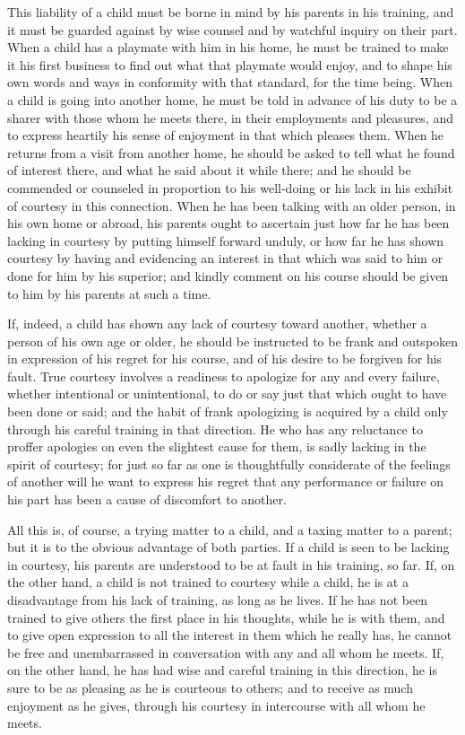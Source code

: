 \documentclass[
]{book}
\begin{document}
This liability of a child must be borne in mind by his parents in his training, and it must be guarded against by wise counsel and by watchful inquiry on their part. When a child has a playmate with him in his home, he must be trained to make it his first business to find out what that playmate would enjoy, and to shape his own words and ways in conformity with that standard, for the time being. When a child is going into another home, he must be told in advance of his duty to be a sharer with those whom he meets there, in their employments and pleasures, and to express heartily his sense of enjoyment in that which pleases them. When he returns from a visit from another home, he should be asked to tell what he found of interest there, and what he said about it while there; and he should be commended or counseled in proportion to his well-doing or his lack in his exhibit of courtesy in this connection. When he has been talking with an older person, in his own home or abroad, his parents ought to ascertain just how far he has been lacking in courtesy by putting himself forward unduly, or how far he has shown courtesy by having and evidencing an interest in that which was said to him or done for him by his superior; and kindly comment on his course should be given to him by his parents at such a time.

If, indeed, a child has shown any lack of courtesy toward another, whether a person of his own age or older, he should be instructed to be frank and outspoken in expression of his regret for his course, and of his desire to be forgiven for his fault. True courtesy involves a readiness to apologize for any and every failure, whether intentional or unintentional, to do or say just that which ought to have been done or said; and the habit of frank apologizing is acquired by a child only through his careful training in that direction. He who has any reluctance to proffer apologies on even the slightest cause for them, is sadly lacking in the spirit of courtesy; for just so far as one is thoughtfully considerate of the feelings of another will he want to express his regret that any performance or failure on his part has been a cause of discomfort to another.

All this is, of course, a trying matter to a child, and a taxing matter to a parent; but it is to the obvious advantage of both parties. If a child is seen to be lacking in courtesy, his parents are understood to be at fault in his training, so far. If, on the other hand, a child is not trained to courtesy while a child, he is at a disadvantage from his lack of training, as long as he lives. If he has not been trained to give others the first place in his thoughts, while he is with them, and to give open expression to all the interest in them which he really has, he cannot be free and unembarrassed in conversation with any and all whom he meets. If, on the other hand, he has had wise and careful training in this direction, he is sure to be as pleasing as he is courteous to others; and to receive as much enjoyment as he gives, through his courtesy in intercourse with all whom he meets.
\end{document}
